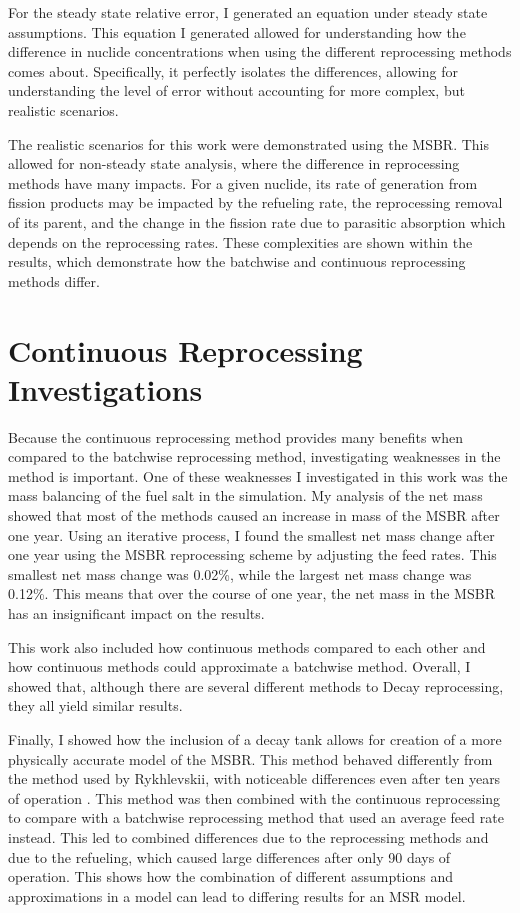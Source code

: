For the steady state relative error, I generated an equation under steady state assumptions.
This equation I generated allowed for understanding how the difference in nuclide concentrations when using the different reprocessing methods comes about.
Specifically, it perfectly isolates the differences, allowing for understanding the level of error without accounting for more complex, but realistic scenarios.

The realistic scenarios for this work were demonstrated using the MSBR.
This allowed for non-steady state analysis, where the difference in reprocessing methods have many impacts.
For a given nuclide, its rate of generation from fission products may be impacted by the refueling rate, the reprocessing removal of its parent, and the change in the fission rate due to parasitic absorption which depends on the reprocessing rates.
These complexities are shown within the results, which demonstrate how the batchwise and continuous reprocessing methods differ.

\section{Continuous Reprocessing Investigations}

Because the continuous reprocessing method provides many benefits when compared to the batchwise reprocessing method, investigating weaknesses in the method is important.
One of these weaknesses I investigated in this work was the mass balancing of the fuel salt in the simulation.
My analysis of the net mass showed that most of the methods caused an increase in mass of the MSBR after one year.
Using an iterative process, I found the smallest net mass change after one year using the MSBR reprocessing scheme by adjusting the feed rates.
This smallest net mass change was 0.02\%, while the largest net mass change was 0.12\%.
This means that over the course of one year, the net mass in the MSBR has an insignificant impact on the results.

This work also included how continuous methods compared to each other and how continuous methods could approximate a batchwise method.
Overall, I showed that, although there are several different methods to Decay reprocessing, they all yield similar results.

Finally, I showed how the inclusion of a decay tank allows for creation of a more physically accurate model of the MSBR.
This method behaved differently from the method used by Rykhlevskii, with noticeable differences even after ten years of operation \cite{rykhlevskii_advanced_2018}.
This method was then combined with the continuous reprocessing to compare with a batchwise reprocessing method that used an average feed rate instead.
This led to combined differences due to the reprocessing methods and due to the refueling, which caused large differences after only 90 days of operation.
This shows how the combination of different assumptions and approximations in a model can lead to differing results for an MSR model.



